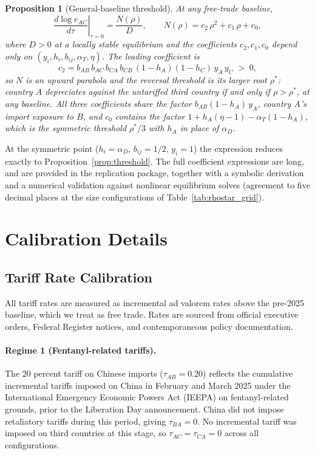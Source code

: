 \documentclass[11pt]{article}
\theoremstyle{plain}
\newtheorem{proposition}{Proposition}
\theoremstyle{remark}
\numberwithin{lemma}{section}
\numberwithin{proposition}{section}
\numberwithin{corollary}{section}
\newenvironment{revblock}{\par\begingroup\color{RevBlue}}{\endgroup\par}
\begin{document}
\begin{appendix}
\begin{revblock}
\begin{proposition}[General-baseline threshold]
\label{prop:general_threshold}
At any free-trade baseline,
\[
\left.\frac{d\log e_{AC}}{d\tau}\right|_{\tau=0} = \frac{N(\rho)}{D},
\qquad
N(\rho) = c_2\,\rho^2 + c_1\,\rho + c_0,
\]
where $D > 0$ at a locally stable equilibrium and the coefficients $c_2, c_1, c_0$ depend only on $(y_i, h_i, b_{ij}, \alpha_T, \eta)$. The leading coefficient is
\[
c_2 = b_{AB}\, b_{AC}\, b_{CA}\, b_{CB}\, (1-h_A)(1-h_C)\, y_A\, y_C \;>\; 0,
\]
so $N$ is an upward parabola and the reversal threshold is its larger root $\rho^*$: country $A$ depreciates against the untariffed third country if and only if $\rho > \rho^*$, at any baseline. All three coefficients share the factor $b_{AB}(1-h_A)\,y_A$, country $A$'s import exposure to $B$, and $c_0$ contains the factor $1 + h_A(\eta-1) - \alpha_T(1-h_A)$, which is the symmetric threshold $\rho^*/3$ with $h_A$ in place of $\alpha_D$.
\end{proposition}

At the symmetric point ($h_i = \alpha_D$, $b_{ij} = 1/2$, $y_i = 1$) the expression reduces exactly to Proposition~\ref{prop:threshold}. The full coefficient expressions are long, and are provided in the replication package, together with a symbolic derivation and a numerical validation against nonlinear equilibrium solves (agreement to five decimal places at the size configurations of Table~\ref{tab:rhostar_grid}).
\end{revblock}

\section{Calibration Details}
\label{app:calibration}

\subsection*{Tariff Rate Calibration}
\label{app:tariffs}
All tariff rates are measured as incremental ad valorem rates above the pre-2025 baseline, which we treat as free trade. Rates are sourced from official executive orders, Federal Register notices, and contemporaneous policy documentation.

\paragraph{Regime 1 (Fentanyl-related tariffs).} The 20 percent tariff on Chinese imports ($\tau_{AB} = 0.20$) reflects the cumulative incremental tariffs imposed on China in February and March 2025 under the International Emergency Economic Powers Act (IEEPA) on fentanyl-related grounds, prior to the Liberation Day announcement. China did not impose retaliatory tariffs during this period, giving $\tau_{BA} = 0$. No incremental tariff was imposed on third countries at this stage, so $\tau_{AC} = \tau_{CA} = 0$ across all configurations.


\end{appendix}
\end{document}
